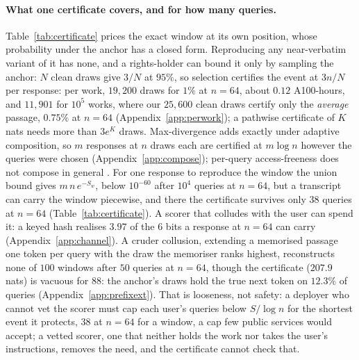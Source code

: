 \paragraph{What one certificate covers, and for how many queries.}\label{sec:compose}
Table~\ref{tab:certificate} prices the exact window at its own position, whose probability under the
anchor has a closed form. Reproducing any near-verbatim variant of it has none, and a rights-holder can
bound it only by sampling the anchor: $N$ clean draws give $3/N$ at $95\%$, so selection certifies the
event at $3n/N$ per response: per work, $19{,}200$ draws for $1\%$ at $n=64$, about $0.12$ A100-hours, and
$11{,}901$ for $10^5$ works, where our $25{,}600$ clean draws certify only the \emph{average} passage,
$0.75\%$ at $n=64$ (Appendix~\ref{app:perwork}); a pathwise certificate of $K$ nats needs more than $3e^{K}$ draws. Max-divergence adds
exactly under adaptive composition, so $m$ responses at $n$ draws each are
certified at $m\log n$ however the queries were chosen (Appendix~\ref{app:compose}); per-query
access-freeness does not compose in general \citep{cohen2025blameless}. For one response to reproduce the
window the union bound gives $m\,n\,e^{-S_w}$, below $10^{-60}$ after $10^4$ queries at $n=64$, but a
transcript can carry the window piecewise, and there the certificate survives only $38$ queries at $n=64$
(Table~\ref{tab:certificate}). A scorer that colludes with the user can spend it: a keyed hash
realises $3.97$ of the $6$ bits a response at $n=64$ can carry (Appendix~\ref{app:channel}). A cruder
collusion, extending a memorised passage one token per query with the draw the memoriser ranks highest,
reconstructs none of $100$ windows after $50$ queries at $n=64$, though the certificate ($207.9$ nats)
is vacuous for $88$: the anchor's draws hold the true next token on $12.3\%$ of queries
(Appendix~\ref{app:prefixext}). That is looseness, not safety: a deployer who cannot vet the scorer must
cap each user's queries below $S/\log n$ for the shortest event it protects, $38$ at $n=64$ for a window, a
cap few public services would accept; a vetted scorer, one that neither holds the work nor takes the user's
instructions, removes the need, and the certificate cannot check that.
